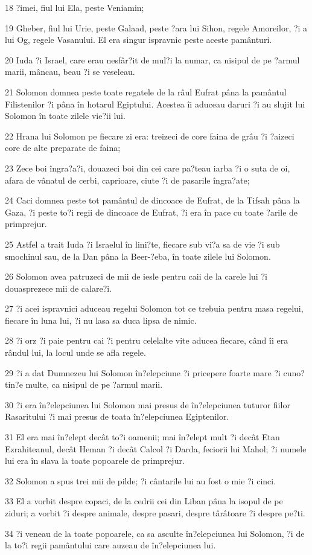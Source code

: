 \par 18 ?imei, fiul lui Ela, peste Veniamin;
\par 19 Gheber, fiul lui Urie, peste Galaad, peste ?ara lui Sihon, regele Amoreilor, ?i a lui Og, regele Vasanului. El era singur ispravnic peste aceste pamânturi.
\par 20 Iuda ?i Israel, care erau nesfâr?it de mul?i la numar, ca nisipul de pe ?armul marii, mâncau, beau ?i se veseleau.
\par 21 Solomon domnea peste toate regatele de la râul Eufrat pâna la pamântul Filistenilor ?i pâna în hotarul Egiptului. Acestea îi aduceau daruri ?i au slujit lui Solomon în toate zilele vie?ii lui.
\par 22 Hrana lui Solomon pe fiecare zi era: treizeci de core faina de grâu ?i ?aizeci core de alte preparate de faina;
\par 23 Zece boi îngra?a?i, douazeci boi din cei care pa?teau iarba ?i o suta de oi, afara de vânatul de cerbi, caprioare, ciute ?i de pasarile îngra?ate;
\par 24 Caci domnea peste tot pamântul de dincoace de Eufrat, de la Tifsah pâna la Gaza, ?i peste to?i regii de dincoace de Eufrat, ?i era în pace cu toate ?arile de primprejur.
\par 25 Astfel a trait Iuda ?i Israelul în lini?te, fiecare sub vi?a sa de vie ?i sub smochinul sau, de la Dan pâna la Beer-?eba, în toate zilele lui Solomon.
\par 26 Solomon avea patruzeci de mii de iesle pentru caii de la carele lui ?i douasprezece mii de calare?i.
\par 27 ?i acei ispravnici aduceau regelui Solomon tot ce trebuia pentru masa regelui, fiecare în luna lui, ?i nu lasa sa duca lipsa de nimic.
\par 28 ?i orz ?i paie pentru cai ?i pentru celelalte vite aducea fiecare, când îi era rândul lui, la locul unde se afla regele.
\par 29 ?i a dat Dumnezeu lui Solomon în?elepciune ?i pricepere foarte mare ?i cuno?tin?e multe, ca nisipul de pe ?armul marii.
\par 30 ?i era în?elepciunea lui Solomon mai presus de în?elepciunea tuturor fiilor Rasaritului ?i mai presus de toata în?elepciunea Egiptenilor.
\par 31 El era mai în?elept decât to?i oamenii; mai în?elept mult ?i decât Etan Ezrahiteanul, decât Heman ?i decât Calcol ?i Darda, feciorii lui Mahol; ?i numele lui era în slava la toate popoarele de primprejur.
\par 32 Solomon a spus trei mii de pilde; ?i cântarile lui au fost o mie ?i cinci.
\par 33 El a vorbit despre copaci, de la cedrii cei din Liban pâna la isopul de pe ziduri; a vorbit ?i despre animale, despre pasari, despre târâtoare ?i despre pe?ti.
\par 34 ?i veneau de la toate popoarele, ca sa asculte în?elepciunea lui Solomon, ?i de la to?i regii pamântului care auzeau de în?elepciunea lui.

